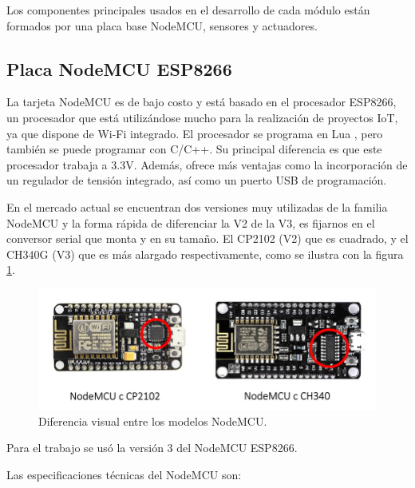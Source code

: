 Los componentes principales usados en el desarrollo de cada módulo están formados por una placa base NodeMCU, sensores y actuadores.

\subsection{Placa NodeMCU ESP8266}

La tarjeta NodeMCU es de bajo costo y está basado en el procesador ESP8266, un procesador que está utilizándose mucho para la realización de proyectos IoT, ya que dispone de Wi-Fi integrado. El procesador se programa en Lua \citep{WEBSITE:38}, pero también se puede programar con C/C++. Su principal diferencia es que este procesador trabaja a 3.3V.  Además, ofrece más ventajas como la incorporación de un regulador de tensión integrado, así como un puerto USB de programación. 

En el mercado actual se encuentran dos versiones muy utilizadas de la familia NodeMCU y la forma rápida de diferenciar la V2 de la V3, es fijarnos en el conversor serial que monta y en su tamaño. El CP2102 (V2) que es cuadrado, y el CH340G (V3) que es más alargado respectivamente, como se ilustra con la figura \ref{fig:nodemcu}.
 

\begin{figure}[htbp]
	\centering
	\includegraphics[width=.85\textwidth]{./Figures/NodeMcu.jpg}
	\caption{Diferencia visual entre los modelos NodeMCU.}

	\label{fig:nodemcu}
\end{figure}

Para el trabajo se usó la versión 3 del NodeMCU ESP8266.

Las especificaciones técnicas del NodeMCU son:

